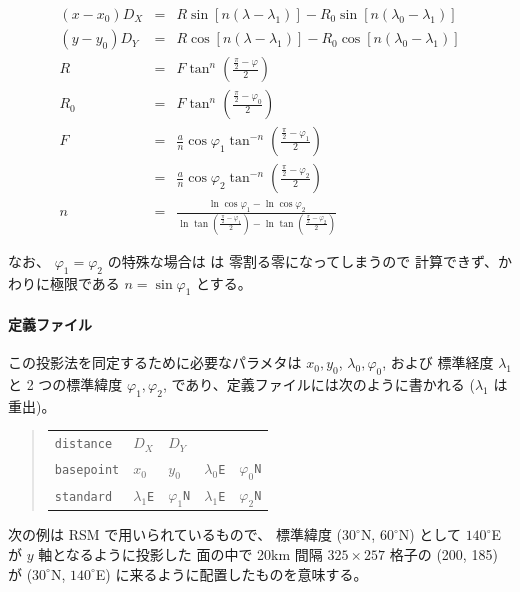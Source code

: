 \begin{eqnarray}
 (x - x_0) D_X
 &=&
 R\sin[n(\lambda - \lambda_1)]
 - R_0\sin[n(\lambda_0 - \lambda_1)]
 \label{eq:lambert:first}
\\
 (y - y_0) D_Y
 &=&
 R\cos[n(\lambda - \lambda_1)]
 - R_0\cos[n(\lambda_0 - \lambda_1)]
\\
 R
 &=&
 F \tan^{n} \left(\frac{\frac{\pi}{2} - \varphi}{2}\right)
\\
 R_0
 &=&
 F \tan^{n} \left(\frac{\frac{\pi}{2} - \varphi_0}{2}\right)
\\
 F
 &=&
 \frac{a}{n} \cos\varphi_1
 \tan^{-n} \left(\frac{\frac{\pi}{2} - \varphi_1}{2}\right)
 \nonumber
\\
 &=&
 \frac{a}{n} \cos\varphi_2
 \tan^{-n} \left(\frac{\frac{\pi}{2} - \varphi_2}{2}\right)
\\
 n
 &=&
 \frac{ \ln\cos\varphi_1 - \ln\cos\varphi_2 }%
 {
	\ln\tan\left(\frac{\frac{\pi}{2} - \varphi_1}{2}\right)
	- \ln\tan\left(\frac{\frac{\pi}{2} - \varphi_2}{2}\right)
 }
 \label{eq:lambert:last}
\end{eqnarray}

なお、
\(\varphi_1 = \varphi_2\)
の特殊な場合は  は
零割る零になってしまうので
計算できず、かわりに極限である
\(
n = \sin\varphi_1
\)
とする。

\paragraph{定義ファイル}
この投影法を同定するために必要なパラメタは
\(x_0, y_0\),
\(\lambda_0, \varphi_0\),
および 標準経度
\(\lambda_1\)
と 2 つの標準緯度
\(\varphi_1, \varphi_2\),
であり、定義ファイルには次のように書かれる ($\lambda_1$ は重出)。
\begin{quote}
\begin{tabular}{lllll}
{\tt distance}	& $D_X$ & $D_Y$ & & \\
{\tt basepoint}	& $x_0$ & $y_0$	& $\lambda_0${\tt E} & $\varphi_0${\tt N} \\
{\tt standard}	& $\lambda_1${\tt E} & $\varphi_1${\tt N} &
	$\lambda_1${\tt E} & $\varphi_2${\tt N} \\
\end{tabular}
\end{quote}

次の例は RSM で用いられているもので、
標準緯度 ($30^\circ$N, $60^\circ$N) として
$140^\circ$E が $y$ 軸となるように投影した
面の中で 20km 間隔 $325\times 257$ 格子の (200, 185) が
($30^\circ$N, $140^\circ$E) に来るように配置したものを意味する。

